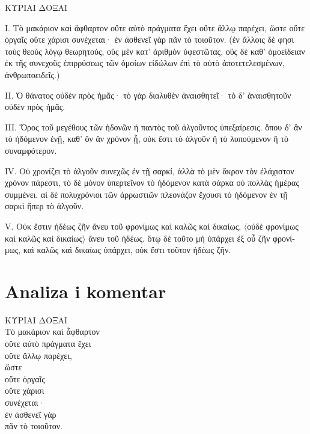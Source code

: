{\large

\begin{greek}

\noindent ΚΥΡΙΑΙ ΔΟΞΑΙ

\noindent I. Τὸ μακάριον καὶ ἄφθαρτον οὔτε αὐτὸ πράγματα ἔχει οὔτε ἄλλῳ παρέχει, ὥστε οὔτε ὀργαῖς οὔτε χάρισι συνέχεται· ἐν ἀσθενεῖ γὰρ πᾶν τὸ τοιοῦτον. (ἐν ἄλλοις δέ φησι τοὺς θεοὺς λόγῳ θεωρητούς, οὓς μὲν κατ' ἀριθμὸν ὑφεστῶτας, οὓς δὲ καθ' ὁμοείδειαν ἐκ τῆς συνεχοῦς ἐπιρρύσεως τῶν ὁμοίων εἰδώλων ἐπὶ τὸ αὐτὸ ἀποτετελεσμένων, ἀνθρωποειδεῖς.)

\noindent II. Ὁ θάνατος οὐδὲν πρὸς ἡμᾶς· τὸ γὰρ διαλυθὲν ἀναισθητεῖ· τὸ δ' ἀναισθητοῦν οὐδὲν πρὸς ἡμᾶς.

\noindent III. Ὅρος τοῦ μεγέθους τῶν ἡδονῶν ἡ παντὸς τοῦ ἀλγοῦντος ὑπεξαίρεσις. ὅπου δ' ἂν τὸ ἡδόμενον ἐνῇ, καθ' ὃν ἂν χρόνον ᾖ, οὐκ ἔστι τὸ ἀλγοῦν ἢ τὸ λυπούμενον ἢ τὸ συναμφότερον.

\noindent IV. Οὐ χρονίζει τὸ ἀλγοῦν συνεχῶς ἐν τῇ σαρκί, ἀλλὰ τὸ μὲν ἄκρον τὸν ἐλάχιστον χρόνον πάρεστι, τὸ δὲ μόνον ὑπερτεῖνον τὸ ἡδόμενον κατὰ σάρκα οὐ πολλὰς ἡμέρας συμμένει. αἱ δὲ πολυχρόνιοι τῶν ἀρρωστιῶν πλεονάζον ἔχουσι τὸ ἡδόμενον ἐν τῇ σαρκὶ ἤπερ τὸ ἀλγοῦν.

\noindent V. Οὐκ ἔστιν ἡδέως ζῆν ἄνευ τοῦ φρονίμως καὶ καλῶς καὶ δικαίως, $\langle$οὐδὲ φρονίμως καὶ καλῶς καὶ δικαίως$\rangle$ ἄνευ τοῦ ἡδέως. ὅτῳ δὲ τοῦτο μὴ ὑπάρχει ἐξ οὗ ζῆν φρονίμως, καὶ καλῶς καὶ δικαίως ὑπάρχει, οὐκ ἔστι τοῦτον ἡδέως ζῆν.

\end{greek}

}


\section*{Analiza i komentar}


{\large
\begin{greek}
\noindent ΚΥΡΙΑΙ ΔΟΞΑΙ\\
Τὸ μακάριον καὶ ἆφθαρτον \\
οὔτε αὐτὸ πράγματα ἔχει \\
οὔτε ἄλλῳ παρέχει, \\
ὥστε \\
\tabto{2em} οὔτε ὀργαῖς \\
\tabto{2em} οὔτε χάρισι \\
συνέχεται· \\
ἐν ἀσθενεῖ γὰρ \\
πᾶν τὸ τοιοῦτον.\\

\end{greek}
}

